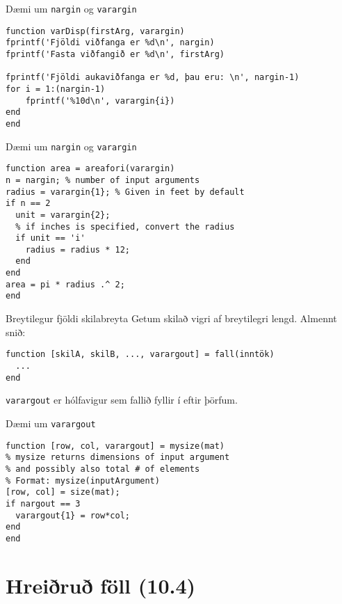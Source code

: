 \documentclass[handout]{beamer}
\begin{document}
\begin{frame}[fragile]{Dæmi um \texttt{nargin} og \texttt{varargin}}
\begin{verbatim}
function varDisp(firstArg, varargin)
fprintf('Fjöldi viðfanga er %d\n', nargin)
fprintf('Fasta viðfangið er %d\n', firstArg)

fprintf('Fjöldi aukaviðfanga er %d, þau eru: \n', nargin-1)
for i = 1:(nargin-1)
    fprintf('%10d\n', varargin{i})
end
end
\end{verbatim}
\end{frame}

\begin{frame}[fragile]{Dæmi um \texttt{nargin} og \texttt{varargin}}
\begin{verbatim}
function area = areafori(varargin)
n = nargin; % number of input arguments
radius = varargin{1}; % Given in feet by default
if n == 2
  unit = varargin{2};
  % if inches is specified, convert the radius
  if unit == 'i'
    radius = radius * 12;
  end
end
area = pi * radius .^ 2;
end
\end{verbatim}

\end{frame}

\begin{frame}[fragile]{Breytilegur fjöldi skilabreyta}
Getum skilað vigri af breytilegri lengd. Almennt snið:
\begin{verbatim}
function [skilA, skilB, ..., varargout] = fall(inntök)
  ...
end
\end{verbatim}
\texttt{varargout} er hólfavigur sem fallið fyllir í eftir þörfum.
\end{frame}

\begin{frame}[fragile]{Dæmi um \texttt{varargout}}
\begin{verbatim}
function [row, col, varargout] = mysize(mat)
% mysize returns dimensions of input argument
% and possibly also total # of elements
% Format: mysize(inputArgument)
[row, col] = size(mat);
if nargout == 3
  varargout{1} = row*col;
end
end
\end{verbatim}

\end{frame}

\section{Hreiðruð föll (10.4)}
\end{document}
